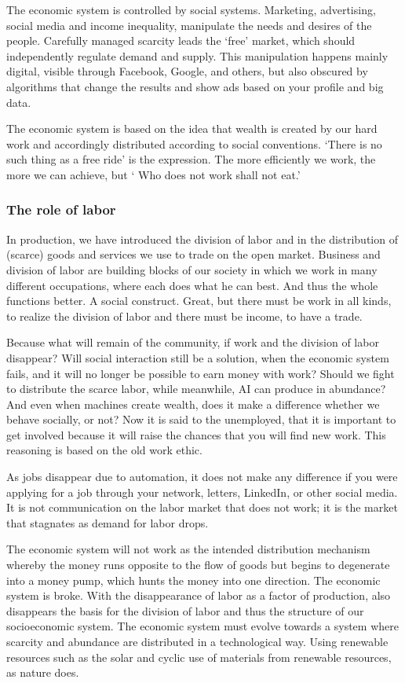 \documentclass[11pt]{article}
\begin{document}
The economic system is controlled by social systems. Marketing, advertising, social media and income inequality, manipulate the needs and desires of the people. Carefully managed scarcity leads the ‘free’ market, which should independently regulate demand and supply. This manipulation happens mainly digital, visible through Facebook, Google, and others, but also obscured by algorithms that change the results and show ads based on your profile and big data.

The economic system is based on the idea that wealth is created by our hard work and accordingly distributed according to social conventions. ‘There is no such thing as a free ride’ is the expression. The more efficiently we work, the more we can achieve, but ‘ Who does not work shall not eat.’

\subsubsection{The role of labor}
\label{sec:orgcb591fb}

In production, we have introduced the division of labor and in the distribution of (scarce) goods and services we use to trade on the open market. Business and division of labor are building blocks of our society in which we work in many different occupations, where each does what he can best. And thus the whole functions better. A social construct. Great, but there must be work in all kinds, to realize the division of labor and there must be income, to have a trade.

Because what will remain of the community, if work and the division of labor disappear? Will social interaction still be a solution, when the economic system fails, and it will no longer be possible to earn money with work? Should we fight to distribute the scarce labor, while meanwhile, AI can produce in abundance? And even when machines create wealth, does it make a difference whether we behave socially, or not? Now it is said to the unemployed, that it is important to get involved because it will raise the chances that you will find new work. This reasoning is based on the old work ethic.

As jobs disappear due to automation, it does not make any difference if you were applying for a job through your network, letters, LinkedIn, or other social media. It is not communication on the labor market that does not work; it is the market that stagnates as demand for labor drops.

The economic system will not work as the intended distribution mechanism whereby the money runs opposite to the flow of goods but begins to degenerate into a money pump, which hunts the money into one direction. The economic system is broke. With the disappearance of labor as a factor of production, also disappears the basis for the division of labor and thus the structure of our socioeconomic system. The economic system must evolve towards a system where scarcity and abundance are distributed in a technological way. Using renewable resources such as the solar and cyclic use of materials from renewable resources, as nature does.
\end{document}

